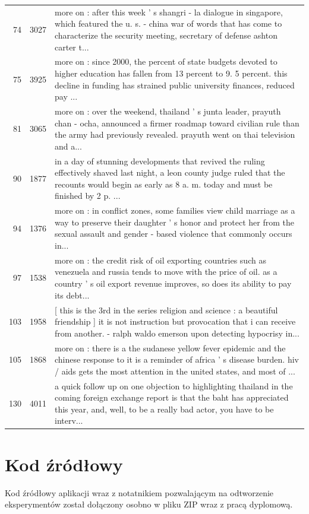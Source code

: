 \documentclass[a4paper,11pt,twoside]{report}
\theoremstyle{definition}
\begin{document}
\begin{longtable}{@{}rcp{}@{}}
74 & 3027 & more on : after this week ' s shangri - la dialogue in singapore, which featured the u. s. - china war of words that has come to characterize the security meeting, secretary of defense ashton carter t... \\
75 & 3925 & more on : since 2000, the percent of state budgets devoted to higher education has fallen from 13 percent to 9. 5 percent. this decline in funding has strained public university finances, reduced pay ... \\
81 & 3065 & more on : over the weekend, thailand ' s junta leader, prayuth chan - ocha, announced a firmer roadmap toward civilian rule than the army had previously revealed. prayuth went on thai television and a... \\
90 & 1877 & in a day of stunning developments that revived the ruling effectively shaved last night, a leon county judge ruled that the recounts would begin as early as 8 a. m. today and must be finished by 2 p. ... \\
94 & 1376 & more on : in conflict zones, some families view child marriage as a way to preserve their daughter ' s honor and protect her from the sexual assault and gender - based violence that commonly occurs in... \\
97 & 1538 & more on : the credit risk of oil exporting countries such as venezuela and russia tends to move with the price of oil. as a country ' s oil export revenue improves, so does its ability to pay its debt... \\
103 & 1958 & [ this is the 3rd in the series religion and science : a beautiful friendship ] it is not instruction but provocation that i can receive from another. - ralph waldo emerson upon detecting hypocrisy in... \\
105 & 1868 & more on : there is a the sudanese yellow fever epidemic and the chinese response to it is a reminder of africa ' s disease burden. hiv / aids gets the most attention in the united states, and most of ... \\
130 & 4011 & a quick follow up on one objection to highlighting thailand in the coming foreign exchange report is that the baht has appreciated this year, and, well, to be a really bad actor, you have to be interv... \\
\end{longtable}

\FloatBarrier

\section{Kod źródłowy}\label{app:code}
Kod źródłowy aplikacji wraz z notatnikiem pozwalającym na odtworzenie eksperymentów został dołączony osobno w pliku ZIP wraz z pracą dyplomową.
\end{document}

